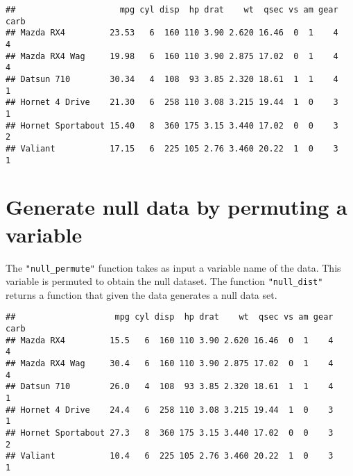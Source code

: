 \begin{Shaded}
\begin{Highlighting}[]
\NormalTok{(}\NormalTok{(}\NormalTok{, } 
\end{Highlighting}
\end{Shaded}

\begin{verbatim}
##                     mpg cyl disp  hp drat    wt  qsec vs am gear carb
## Mazda RX4         23.53   6  160 110 3.90 2.620 16.46  0  1    4    4
## Mazda RX4 Wag     19.98   6  160 110 3.90 2.875 17.02  0  1    4    4
## Datsun 710        30.34   4  108  93 3.85 2.320 18.61  1  1    4    1
## Hornet 4 Drive    21.30   6  258 110 3.08 3.215 19.44  1  0    3    1
## Hornet Sportabout 15.40   8  360 175 3.15 3.440 17.02  0  0    3    2
## Valiant           17.15   6  225 105 2.76 3.460 20.22  1  0    3    1
\end{verbatim}

\section{Generate null data by permuting a
variable}\label{generate-null-data-by-permuting-a-variable}

The \texttt{"null\_permute"} function takes as input a variable name of
the data. This variable is permuted to obtain the null dataset. The
function \texttt{"null\_dist"} returns a function that given the data
generates a null data set.

\begin{Shaded}
\begin{Highlighting}[]
\NormalTok{(}\NormalTok{(}
\end{Highlighting}
\end{Shaded}

\begin{verbatim}
##                    mpg cyl disp  hp drat    wt  qsec vs am gear carb
## Mazda RX4         15.5   6  160 110 3.90 2.620 16.46  0  1    4    4
## Mazda RX4 Wag     30.4   6  160 110 3.90 2.875 17.02  0  1    4    4
## Datsun 710        26.0   4  108  93 3.85 2.320 18.61  1  1    4    1
## Hornet 4 Drive    24.4   6  258 110 3.08 3.215 19.44  1  0    3    1
## Hornet Sportabout 27.3   8  360 175 3.15 3.440 17.02  0  0    3    2
## Valiant           10.4   6  225 105 2.76 3.460 20.22  1  0    3    1
\end{verbatim}


